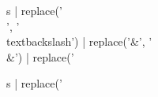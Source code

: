 {%
{{ s | replace('\\', '\\textbackslash{}') | replace('&', '\\&') | replace('%
{%
{%
{{ s | replace('%
{%
{%
{%
%
%
%
%
%
%
{%
{%
%
%
%

{%
{%

}}}}}}}}}}}}}}
